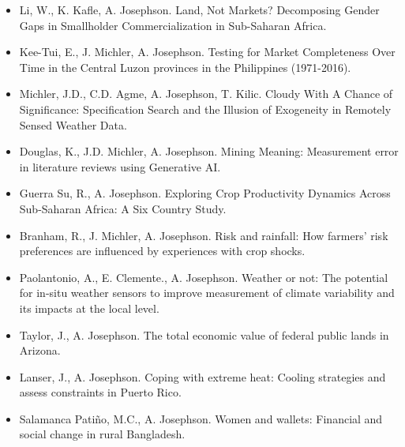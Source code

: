 \documentclass[letterpaper]{article}
\begin{document}
\begin{itemize}

\item Li, W., K. Kafle, A. Josephson. Land, Not Markets? Decomposing Gender Gaps in Smallholder Commercialization in Sub-Saharan Africa.

\item Kee-Tui, E., J. Michler, A. Josephson. Testing for Market Completeness Over Time in the Central Luzon provinces in the Philippines (1971-2016). 

\item Michler, J.D., C.D. Agme, A. Josephson, T. Kilic. Cloudy With A Chance of Significance: Specification Search and the Illusion of Exogeneity in Remotely Sensed Weather Data.

\item Douglas, K., J.D. Michler, A. Josephson. Mining Meaning: Measurement error in literature reviews using Generative AI.

\item Guerra Su, R., A. Josephson. Exploring Crop Productivity Dynamics Across Sub-Saharan Africa: A Six Country Study. 

\item Branham, R., J. Michler, A. Josephson. Risk and rainfall: How farmers' risk preferences are influenced by experiences with crop shocks.

\item Paolantonio, A., E. Clemente., A. Josephson. Weather or not: The potential for in-situ weather sensors to improve measurement of climate variability and its impacts at the local level. 

\item Taylor, J., A. Josephson. The total economic value of federal public lands in Arizona.

\item Lanser, J., A. Josephson. Coping with extreme heat: Cooling strategies and assess constraints in Puerto Rico.

\item Salamanca Patiño, M.C., A. Josephson. Women and wallets: Financial and social change in rural Bangladesh. 

\end{itemize}
\renewenvironment{itemize}{
  \begin{list}{}{
    \setlength{\leftmargin}{1.5em}
  }
}{
  \end{list}
}
\end{document}
